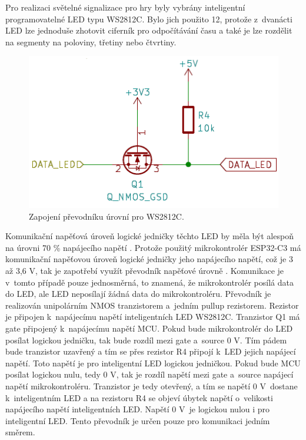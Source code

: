 Pro realizaci světelné signalizace pro hry byly vybrány inteligentní programovatelné LED typu WS2812C. Bylo jich použito 12, protože 
z~dvanácti LED lze jednoduše zhotovit ciferník pro odpočítávání času a také je lze rozdělit na segmenty na poloviny, třetiny nebo čtvrtiny. 

\begin{figure}[!h]
  \begin{center}
    \includegraphics[scale=0.6]{obrazky/prevodnik_urovni_pro_WS2812C.png}
  \end{center}
  \caption[Zapojení převodníku úrovní pro WS2812C]{Zapojení převodníku úrovní pro WS2812C.}
\end{figure} 

Komunikační napěťová úroveň logické jedničky těchto LED by měla být alespoň na úrovni 70 \% napájecího napětí \cite{WS2812C_dtsh}. 
Protože použitý mikrokontrolér ESP32-C3 má komunikační napěťovou úroveň logické jedničky jeho napájecího napětí, což je 3 až 3,6 V, 
tak je zapotřebí využít převodník napěťové úrovně \cite{ESP_C3_dtsh}. Komunikace je v~tomto případě pouze jednosměrná, 
to znamená, že mikrokontrolér posílá data do LED, ale LED neposílají žádná data do mikrokontroléru. Převodník je realizován unipolárním 
NMOS tranzistorem 
a~jedním pullup rezistorem. Rezistor je připojen k~napájecímu napětí inteligentních LED WS2812C. 
Tranzistor Q1 má gate připojený k~napájecímu napětí MCU. Pokud bude mikrokontrolér do LED posílat logickou jedničku, tak bude rozdíl
mezi gate a~source 0 V. Tím pádem bude tranzistor uzavřený a tím se přes rezistor R4 připojí k~LED jejich napájecí napětí. Toto napětí 
je pro inteligentní LED logickou jedničkou. Pokud bude MCU posílat logickou nulu, tedy 0 V, tak je rozdíl napětí mezi gate a~source 
napájecí napětí mikrokontroléru. Tranzistor je tedy otevřený, a tím se napětí 0 V~dostane k~inteligentním LED a na rezistoru R4 se objeví
úbytek napětí o~velikosti napájecího napětí inteligentních LED. Napětí 0 V~je logickou nulou i pro inteligentní LED. Tento převodník
je určen pouze pro komunikaci jedním směrem. 

